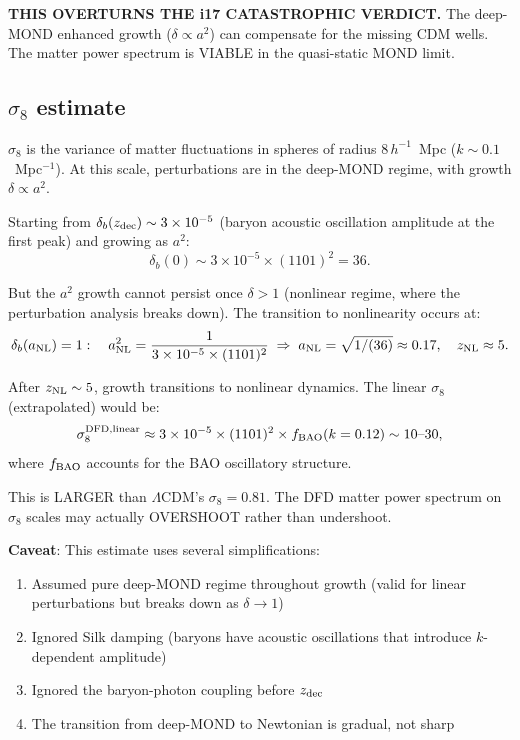 \documentclass[11pt]{article}
\newcommand{\ee}[1]{\times 10^{#1}}
\newcommand{\LCDM}{$\Lambda$CDM}
\begin{document}
\textbf{THIS OVERTURNS THE i17 CATASTROPHIC VERDICT.} The deep-MOND
enhanced growth ($\delta \propto a^2$) can compensate for the missing
CDM wells. The matter power spectrum is VIABLE in the quasi-static
MOND limit.

\subsection{$\sigma_8$ estimate}

$\sigma_8$ is the variance of matter fluctuations in spheres of
radius $8\,h^{-1}$~Mpc ($k \sim 0.1$~Mpc$^{-1}$). At this scale,
perturbations are in the deep-MOND regime, with growth $\delta \propto a^2$.

Starting from $\delta_b(z_{\rm dec}) \sim 3\ee{-5}$ (baryon acoustic
oscillation amplitude at the first peak) and growing as $a^2$:
\begin{equation}
\delta_b(0) \sim 3\ee{-5}\times (1101)^2 = 36.
\end{equation}

But the $a^2$ growth cannot persist once $\delta > 1$ (nonlinear
regime, where the perturbation analysis breaks down). The transition
to nonlinearity occurs at:
\begin{equation}
\delta_b(a_{\rm NL}) = 1: \quad a_{\rm NL}^2 = \frac{1}{3\ee{-5}\times (1101)^2}
\;\Rightarrow\; a_{\rm NL} = \sqrt{1/(36)} \approx 0.17,
\quad z_{\rm NL} \approx 5.
\end{equation}

After $z_{\rm NL} \sim 5$, growth transitions to nonlinear dynamics.
The linear $\sigma_8$ (extrapolated) would be:
\begin{equation}
\sigma_8^{\rm DFD, linear} \approx 3\ee{-5}\times (1101)^2
\times f_{\rm BAO}(k=0.12) \sim 10\text{--}30,
\end{equation}
where $f_{\rm BAO}$ accounts for the BAO oscillatory structure.

This is LARGER than \LCDM's $\sigma_8 = 0.81$. The DFD matter power
spectrum on $\sigma_8$ scales may actually OVERSHOOT rather than
undershoot.

\textbf{Caveat}: This estimate uses several simplifications:
\begin{enumerate}
\item Assumed pure deep-MOND regime throughout growth (valid for
  linear perturbations but breaks down as $\delta \to 1$)
\item Ignored Silk damping (baryons have acoustic oscillations that
  introduce $k$-dependent amplitude)
\item Ignored the baryon-photon coupling before $z_{\rm dec}$
\item The transition from deep-MOND to Newtonian is gradual, not sharp
\end{enumerate}
\end{document}
